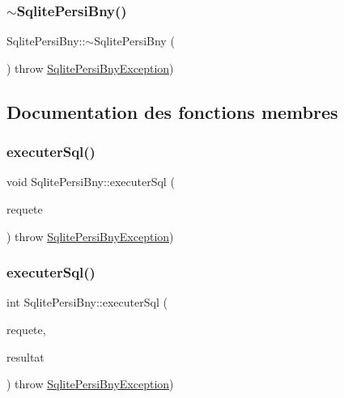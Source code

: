\mbox{\label{classSqlitePersiBny_a20a424146469e8d6ca9347c660d1027c}} 
\subsubsection{\texorpdfstring{$\sim$\+Sqlite\+Persi\+Bny()}{~SqlitePersiBny()}}
{\footnotesize\ttfamily Sqlite\+Persi\+Bny\+::$\sim$\+Sqlite\+Persi\+Bny (\begin{DoxyParamCaption}{ }\end{DoxyParamCaption}) throw  \hyperlink{classSqlitePersiBnyException}{Sqlite\+Persi\+Bny\+Exception}) \hspace{0.3cm}{\ttfamily [virtual]}}



\subsection{Documentation des fonctions membres}
\mbox{\label{classSqlitePersiBny_aa018371d06ba831126a6c4fdc77b741f}} 
\subsubsection{\texorpdfstring{executer\+Sql()}{executerSql()}\hspace{0.1cm}{\footnotesize\ttfamily [1/2]}}
{\footnotesize\ttfamily void Sqlite\+Persi\+Bny\+::executer\+Sql (\begin{DoxyParamCaption}\item[{std\+::string}]{requete }\end{DoxyParamCaption}) throw  \hyperlink{classSqlitePersiBnyException}{Sqlite\+Persi\+Bny\+Exception}) }

\mbox{\label{classSqlitePersiBny_aaca09292fb3eb5e7bbf176c86964ff73}} 
\subsubsection{\texorpdfstring{executer\+Sql()}{executerSql()}\hspace{0.1cm}{\footnotesize\ttfamily [2/2]}}
{\footnotesize\ttfamily int Sqlite\+Persi\+Bny\+::executer\+Sql (\begin{DoxyParamCaption}\item[{std\+::string}]{requete,  }\item[{\hyperlink{classSqlitePersiBny_a04bdd1bacd9241210ea44ec2c072f79b}{Sqlite\+Persi\+Bny\+::\+Resultat} \&}]{resultat }\end{DoxyParamCaption}) throw  \hyperlink{classSqlitePersiBnyException}{Sqlite\+Persi\+Bny\+Exception}) }

